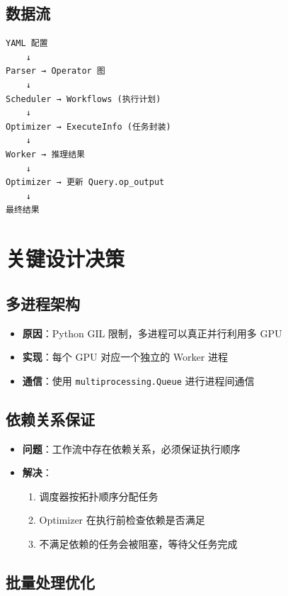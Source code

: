 \documentclass[12pt,a4paper]{article}
\begin{document}
\subsection{数据流}

\begin{verbatim}
YAML 配置
    ↓
Parser → Operator 图
    ↓
Scheduler → Workflows (执行计划)
    ↓
Optimizer → ExecuteInfo (任务封装)
    ↓
Worker → 推理结果
    ↓
Optimizer → 更新 Query.op_output
    ↓
最终结果
\end{verbatim}

\section{关键设计决策}

\subsection{多进程架构}

\begin{itemize}
    \item \textbf{原因}：Python GIL 限制，多进程可以真正并行利用多 GPU
    \item \textbf{实现}：每个 GPU 对应一个独立的 Worker 进程
    \item \textbf{通信}：使用 \texttt{multiprocessing.Queue} 进行进程间通信
\end{itemize}

\subsection{依赖关系保证}

\begin{itemize}
    \item \textbf{问题}：工作流中存在依赖关系，必须保证执行顺序
    \item \textbf{解决}：
    \begin{enumerate}
        \item 调度器按拓扑顺序分配任务
        \item Optimizer 在执行前检查依赖是否满足
        \item 不满足依赖的任务会被阻塞，等待父任务完成
    \end{enumerate}
\end{itemize}

\subsection{批量处理优化}
\end{document}
